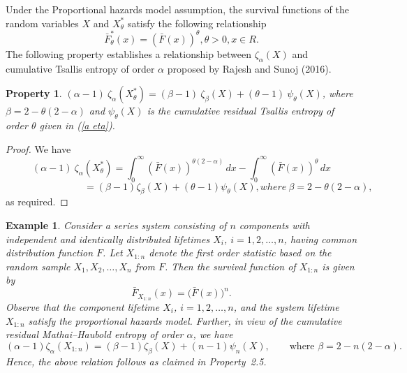 \documentclass[11pt,reqno]{amsart}
\theoremstyle{tight}
\newtheorem{example}{Example}[section]
\newtheorem{property}{Property}[section]
\begin{document}
 Under the Proportional hazards  model assumption, the survival functions of the random variables $X$ and $X_{\theta}^*$ satisfy the following relationship
  $$\bar{F}_\theta^*(x)=(\bar{F}(x))^\theta, \theta>0,x \in R.$$
   The following property establishes a relationship between $\zeta_{\alpha}(X)$ and cumulative Tsallis entropy of order $\alpha$ proposed by Rajesh and Sunoj (2016).
\begin{property}
$(\alpha-1)~\zeta_{\alpha}(X_\theta^*)=(\beta-1)~\zeta_{\beta}(X)+(\theta-1)~\psi_{\theta}(X)$,
where $\beta=2-\theta(2-\alpha)$ and $\psi_{\theta}(X)$ is the  cumulative
residual Tsallis entropy of order $\theta$ given in (\ref{a eta}).
\end{property}
\begin{proof}
   We have
  \[ (\alpha-1)~\zeta_{\alpha}(X_\theta^*)= {\int_0^\infty} (\bar{F}(x))^{\theta(2-\alpha)} \,dx -{\int_0^\infty} (\bar{F}(x))^{\theta} \,dx
  \]
\[
\qquad\qquad\qquad\qquad=({\beta-1})\zeta_{\beta}(X)+({\theta-1})\psi_{\theta}(X), where~ \beta=2-\theta(2-\alpha),
\]
as required.
\end{proof}
\begin{example}
Consider a series system consisting of $n$ components with independent and identically distributed lifetimes $X_i$, $i=1,2,\ldots,n$, having common distribution function $F$. Let $X_{1:n}$ denote the first order statistic based on the random sample $X_1,X_2,\ldots,X_n$ from $F$. Then the survival function of $X_{1:n}$ is given by
\[
\bar{F}_{X_{1:n}}(x)=\bigl(\bar{F}(x)\bigr)^n.
\]
Observe that the component lifetime $X_i$, $i=1,2,\ldots,n$, and the system lifetime $X_{1:n}$ satisfy the proportional hazards model. Further, in view of the cumulative residual Mathai--Haubold entropy of order $\alpha$, we have
\[
(\alpha-1)\zeta_{\alpha}(X_{1:n})
= (\beta-1)\zeta_{\beta}(X) + (n-1)\psi_{n}(X),
\qquad \text{where } \beta = 2-n(2-\alpha).
\]
Hence, the above relation follows as claimed in Property~2.5.
\end{example}
\end{document}
